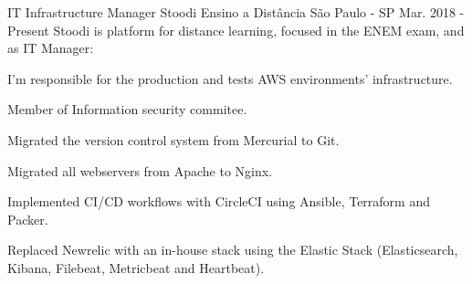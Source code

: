 
\begin{cventries}


  \cventry
    {IT Infrastructure Manager} %
    {Stoodi Ensino a Distância} %
    {São Paulo - SP} %
    {Mar. 2018 - Present} %
    {
      Stoodi is platform for distance learning, focused in the ENEM exam, and as IT Manager:
    }
    {
      \begin{cvitems} %
            \item {I'm responsible for the production and tests AWS environments' 
                  infrastructure.}
            \item {Member of Information security commitee.}
            \item {Migrated the version control system from Mercurial to Git.}
            \item {Migrated all webservers from Apache to Nginx.}
            \item {Implemented CI/CD workflows with CircleCI using Ansible, Terraform 
                  and Packer.}
            \item {Replaced Newrelic with an in-house stack using the Elastic Stack 
                  (Elasticsearch, Kibana, Filebeat, Metricbeat and Heartbeat).}
      \end{cvitems}
    }


\end{cventries}
